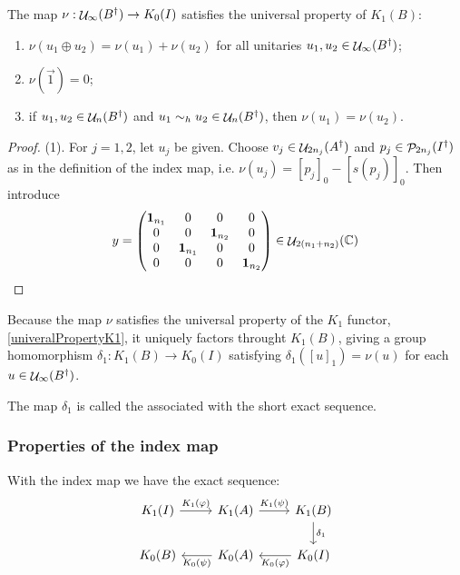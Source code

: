 \begin{lemma}
The map $\nu: \mathop{\mathcal{U}}\nolimits_\infty(B^\dagger)\to K_0(I)$ satisfies the universal property of $K_1(B)$:
\begin{enumerate}
\item $\nu(u_1\oplus u_2) = \nu(u_1)+\nu(u_2)$ for all unitaries $u_1,u_2\in\mathop{\mathcal{U}}\nolimits_\infty(B^\dagger)$;
\item $\nu(\vec{1}) = 0$;
\item if $u_1,u_2\in\mathop{\mathcal{U}}\nolimits_n(B^\dagger)$ and $u_1\sim_h u_2 \in \mathop{\mathcal{U}}\nolimits_n(B^\dagger)$, then $\nu(u_1) = \nu(u_2)$.
\end{enumerate}
\end{lemma}
\begin{proof}
(1). For $j=1,2$, let $u_j$ be given. Choose $v_j \in \mathop{\mathcal{U}}\nolimits_{2n_j}(A^\dagger)$ and $p_j \in \mathop{\mathcal{P}}\nolimits_{2n_j}(I^\dagger)$ as in the definition of the index map, i.e. $\nu(u_j) = [p_j]_0 - [s(p_j)]_0$. Then introduce
\[ y = \begin{pmatrix}
\boldsymbol{\mathrm{1}}_{n_1} & 0 & 0 & 0 \\
0 & 0 & \boldsymbol{\mathrm{1}}_{n_2} & 0 \\
0 & \boldsymbol{\mathrm{1}}_{n_1} & 0 & 0 \\
0 & 0 & 0 & \boldsymbol{\mathrm{1}}_{n_2}
\end{pmatrix}\in \mathop{\mathcal{U}}\nolimits_{2(n_1+n_2)}(\mathbb{C}) \]
\end{proof}

Because the map $\nu$ satisfies the universal property of the $K_1$ functor, \ref{univeralPropertyK1}, it uniquely factors throught $K_1(B)$, giving a group homomorphism $\delta_1: K_1(B)\to K_0(I)$ satisfying $\delta_1([u]_1) = \nu(u)$ for each $u\in\mathop{\mathcal{U}}\nolimits_\infty(B^\dagger)$.

The map $\delta_1$ is called the  associated with the short exact sequence.

\subsubsection{Properties of the index map}
With the index map we have the exact sequence:
\[ \begin{tikzcd}
K_1(I) \rar{K_1(\varphi)} & K_1(A) \rar{K_1(\psi)} & K_1(B) \dar{\delta_1} \\
K_0(B) & K_0(A) \lar{K_0(\psi)} & K_0(I) \lar{K_0(\varphi)}
\end{tikzcd} \]

